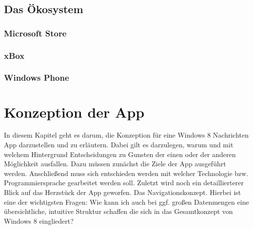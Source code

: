 \documentclass[12pt,a4paper]{scrartcl}
\begin{document}
\subsection{Das Ökosystem}
\label{subsec:ökosystem}
\subsubsection{Microsoft Store}
\label{subsubsec:store}
\subsubsection{xBox}
\label{subsubsec:xbox}
\subsubsection{Windows Phone}
\label{subsubsec:windowsphone}
\newpage
\section{Konzeption der App}
\label{sec:konzeption}
In diesem Kapitel geht es darum, die Konzeption für eine Windows 8 Nachrichten App darzustellen und zu erläutern. Dabei gilt es darzulegen, warum und mit welchem Hintergrund Entscheidungen zu Gunsten der einen oder der anderen Möglichkeit ausfallen. Dazu müssen zunächst die Ziele der App ausgeführt werden. Anschließend muss sich entschieden werden mit welcher Technologie bzw. Programmiersprache gearbeitet werden soll. Zuletzt wird noch ein detaillierterer Blick auf das Herzstück der App geworfen. Das Navigationskonzept. Hierbei ist eine der wichtigsten Fragen: \glqq Wie kann ich auch bei ggf. großen Datenmengen eine übersichtliche, intuitive Struktur schaffen die sich in das Gesamtkonzept von Windows 8 eingliedert?\grqq  
\end{document}
